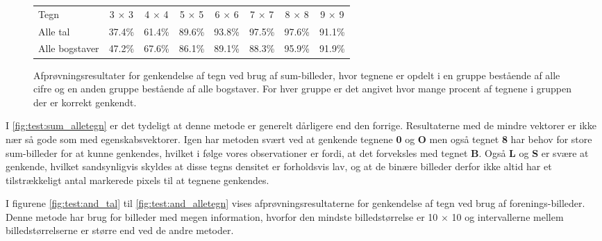 \begin{figure}[htp]
\centering
\begin{tabular}{|l|c|c|c|c|c|c|c|}\hline
\rowcolor[gray]{0.9} \multicolumn{8}{|>{\columncolor[gray]{0.9}}c|}{\textbf{Genkendelse af tegn - Sum-billeder}} \\ \hline
Tegn & 3 $\times$ 3 & 4 $\times$ 4 & 5 $\times$ 5 & 6 $\times$ 6 & 7 $\times$ 7 & 8 $\times$ 8 & 9 $\times$ 9 \\\hline
Alle tal & 37.4\% & 61.4\% & 89.6\% & 93.8\% & 97.5\% & 97.6\% & 91.1\%\\\hline
Alle bogstaver & 47.2\% & 67.6\% & 86.1\% & 89.1\% & 88.3\% & 95.9\% & 91.9\%\\\hline
\end{tabular}
\caption{Afprøvningsresultater for genkendelse af tegn ved brug af sum-billeder, hvor tegnene er opdelt i en gruppe bestående af alle cifre og en anden gruppe bestående af alle bogstaver. For hver gruppe er det angivet hvor mange procent af tegnene i gruppen der er korrekt genkendt.}
\label{fig:test:sum_alletegn}
\end{figure}


I \vref{fig:test:sum_alletegn} er det tydeligt at denne metode er generelt dårligere end den forrige. Resultaterne med de mindre vektorer er ikke nær så gode som med egenskabsvektorer. Igen har metoden svært ved at genkende tegnene \textbf{0} og \textbf{O} men også tegnet \textbf{8} har behov for store sum-billeder for at kunne genkendes, hvilket i følge vores observationer er fordi, at det forveksles med tegnet \textbf{B}. Også \textbf{L} og \textbf{S} er svære at genkende, hvilket sandsynligvis skyldes at disse tegns densitet er forholdsvis lav, og at de binære billeder derfor ikke altid har et tilstrækkeligt antal markerede pixels til at tegnene genkendes.

I figurene \ref{fig:test:and_tal} til \ref{fig:test:and_alletegn} vises afprøvningsresultaterne for genkendelse af tegn ved brug af forenings-billeder. Denne metode har brug for billeder med megen information, hvorfor den mindste billedstørrelse er 10 $\times$ 10 og intervallerne mellem billedstørrelserne er større end ved de andre metoder.


